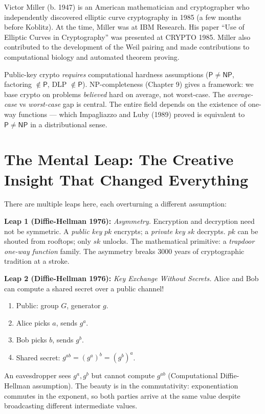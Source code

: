Victor Miller (b. 1947) is an American mathematician and cryptographer who independently discovered elliptic curve cryptography in 1985 (a few months before Koblitz). At the time, Miller was at IBM Research. His paper ``Use of Elliptic Curves in Cryptography'' was presented at CRYPTO 1985. Miller also contributed to the development of the Weil pairing and made contributions to computational biology and automated theorem proving.

Public-key crypto \emph{requires} computational hardness assumptions ($\mathsf{P} \neq \mathsf{NP}$, factoring $\notin \mathsf{P}$, DLP $\notin \mathsf{P}$). NP-completeness (Chapter 9) gives a framework: we base crypto on problems \emph{believed} hard on average, not worst-case. The \emph{average-case} vs \emph{worst-case} gap is central. The entire field depends on the existence of one-way functions — which Impagliazzo and Luby (1989) proved is equivalent to $\mathsf{P} \neq \mathsf{NP}$ in a distributional sense.

\section{The Mental Leap: The Creative Insight That Changed Everything}
\label{sec:crypto:leap}

There are multiple leaps here, each overturning a different assumption:

\textbf{Leap 1 (Diffie-Hellman 1976):} \emph{Asymmetry.} Encryption and decryption need not be symmetric. A \emph{public key} $pk$ encrypts; a \emph{private key} $sk$ decrypts. $pk$ can be shouted from rooftops; only $sk$ unlocks. The mathematical primitive: a \emph{trapdoor one-way function} family. The asymmetry breaks 3000 years of cryptographic tradition at a stroke.

\textbf{Leap 2 (Diffie-Hellman 1976):} \emph{Key Exchange Without Secrets.} Alice and Bob can compute a shared secret over a public channel!
\begin{enumerate}
\item Public: group $G$, generator $g$.
\item Alice picks $a$, sends $g^a$.
\item Bob picks $b$, sends $g^b$.
\item Shared secret: $g^{ab} = (g^a)^b = (g^b)^a$.
\end{enumerate}
An eavesdropper sees $g^a, g^b$ but cannot compute $g^{ab}$ (Computational Diffie-Hellman assumption). The beauty is in the commutativity: exponentiation commutes in the exponent, so both parties arrive at the same value despite broadcasting different intermediate values.

